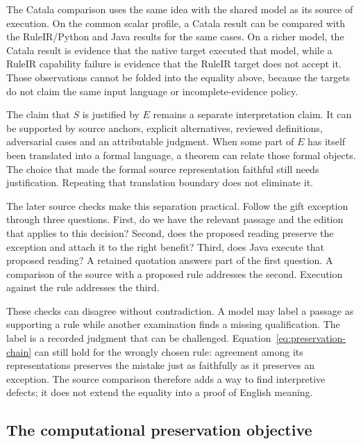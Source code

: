 \documentclass[12pt,a4paper,oneside,openany]{book}
\begin{document}
The Catala comparison uses the same idea with the shared model as its source of
execution. On the common scalar profile, a Catala result can be compared with
the RuleIR/Python and Java results for the same cases. On a richer model, the
Catala result is evidence that the native target executed that model, while a
RuleIR capability failure is evidence that the RuleIR target does not accept it.
Those observations cannot be folded into the equality above, because the
targets do not claim the same input language or incomplete-evidence policy.

The claim that $S$ is justified by $E$ remains a separate interpretation claim.
It can be supported by source anchors, explicit alternatives, reviewed
definitions, adversarial cases and an attributable judgment. When some part of
$E$ has itself been translated into a formal language, a theorem can relate
those formal objects. The choice that made the formal source representation
faithful still needs justification. Repeating that translation boundary does not
eliminate it.

The later source checks make this separation practical. Follow the gift
exception through three questions. First, do we have the relevant passage and
the edition that applies to this decision? Second, does the proposed reading
preserve the exception and attach it to the right benefit? Third, does Java
execute that proposed reading? A retained quotation answers part of the first
question. A comparison of the source with a proposed rule addresses the second.
Execution against the rule addresses the third.

These checks can disagree without contradiction. A model may label a passage
as supporting a rule while another examination finds a missing qualification.
The label is a recorded judgment that can be challenged. Equation~\eqref{eq:preservation-chain}
can still hold for the wrongly chosen rule: agreement among its representations
preserves the mistake just as faithfully as it preserves an exception. The
source comparison therefore adds a way to find interpretive defects; it does
not extend the equality into a proof of English meaning.


\subsection{The computational preservation objective}
\label{merge:P-03-product:05}
\end{document}
